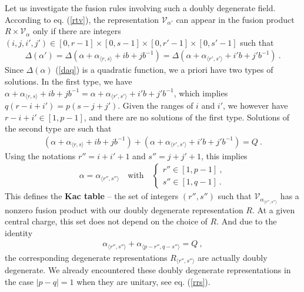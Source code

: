 \documentclass[12pt,a4paper,notitlepage]{report}
\newcommand \bla {\left\{\begin{array}{l} }
\newcommand \ela {\end{array}\right. }
\numberwithin{equation}{section}
\theoremstyle{break}
\begin{document}
Let us investigate the fusion rules involving such a doubly degenerate field. According to eq. (\ref{rtv}), the representation $\mathcal{V}_{\alpha'} $ can appear in the fusion product $R\times \mathcal{V}_\alpha$ only if there are integers $(i,j,i',j')\in [0,r-1]\times [0,s-1]\times [0,r'-1]\times [0,s'-1]$ such that 
\begin{align}
 \Delta(\alpha') = \Delta\left(\alpha+\alpha_{\langle r,s \rangle} + ib+jb^{-1}\right) = \Delta\left(\alpha+\alpha_{\langle r',s' \rangle} +i'b+j'b^{-1}\right) \ .
\end{align}
Since $\Delta(\alpha)$ (\ref{daq}) is a quadratic function, we a priori have two types of solutions. In the first type, we have $\alpha+\alpha_{\langle r,s \rangle} + ib+jb^{-1} = \alpha+\alpha_{\langle r',s' \rangle} +i'b+j'b^{-1}$, which implies $q(r-i+i')=p(s-j+j')$. Given the ranges of $i$ and $i'$, we however have $r-i+i'\in [1,p-1]$, and there are no solutions of the first type. Solutions of the second type are such that 
\begin{align}
 \left(\alpha+\alpha_{\langle r,s \rangle} + ib+jb^{-1}\right) + \left(\alpha+\alpha_{\langle r',s' \rangle} +i'b+j'b^{-1}\right) = Q\ .
\end{align}
Using the notations $r'' = i+i'+1$ and $s''=j+j'+1$, this implies
\begin{align}
 \alpha=\alpha_{\langle r'',s'' \rangle}\quad \text{with}\quad  \bla r'' \in [1,p-1]\ , \\ s'' \in [1,q-1]\ . \ela
\label{rpsq}
\end{align}
This defines the \textbf{\boldmath Kac table} -- the set of integers $(r'',s'')$ such that $\mathcal{V}_{\alpha_{\langle r'',s''\rangle}}$ has a nonzero fusion product with our doubly degenerate representation $R$. At a given central charge, this set does not depend on the choice of $R$. 
And due to the identity 
\begin{align}
 \alpha_{\langle r'',s'' \rangle}+\alpha_{\langle p-r'',q-s'' \rangle}=Q\ ,
\end{align}
the corresponding degenerate representations $R_{\langle r'', s'' \rangle}$ are actually doubly degenerate. 
We already encountered these doubly degenerate representations in the case $|p-q|=1$ when they are unitary, see eq. (\ref{rrs}). 
\end{document}
